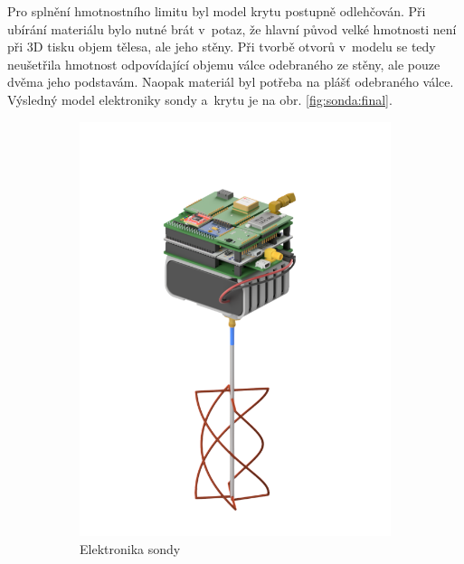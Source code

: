 \documentclass[twoside]{ctuthesis}
\theoremstyle{plain}
\theoremstyle{definition}
\theoremstyle{note}
\begin{document}
	Pro splnění hmotnostního limitu byl model krytu postupně odlehčován. Při ubírání materiálu bylo nutné brát v~potaz, že hlavní původ velké hmotnosti není při 3D tisku objem tělesa, ale jeho stěny. Při tvorbě otvorů v~modelu se tedy neušetřila hmotnost odpovídající objemu válce odebraného ze stěny, ale pouze dvěma jeho podstavám. Naopak materiál byl potřeba na plášť odebraného válce. Výsledný model elektroniky sondy a~krytu je na obr. \ref{fig:sonda:final}.
	\begin{figure}[hbtp]
		\centering
		\begin{subfigure}{.49\textwidth}
			\centering
			\includegraphics[width = .85\textwidth]{Figures/sonda_no_case.png}
			\caption{Elektronika sondy}
			\label{fig:sonda:no:case}
		\end{subfigure}
		\begin{subfigure}{.49\textwidth}
			\centering

\end{subfigure}
\end{figure}
\end{document}
